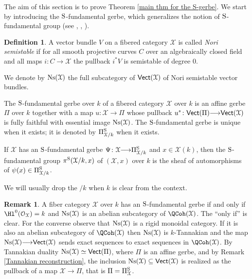 \documentclass[12pt,reqno]{amsart}
\theoremstyle{plain}
\theoremstyle{definition}
\newtheorem{defn}[thm]{Definition}
\newtheorem{rmk}[thm]{Remark}
\numberwithin{thm}{section}
\newcounter{x}\setcounter{x}{1}
\theoremstyle{plain}
\begin{document}
The aim of this section is to prove Theorem \ref{main thm for the S-gerbe}.
We start by introducing the ${\textup{S}}$-fundamental gerbe, which generalizes the notion of ${\textup{S}}$-fundamental group (see \cite{BPS}, \cite{L1}, \cite{L2}). 

\begin{defn}\label{Nori semistable}
A vector bundle $V$ on a fibered category ${\mathcal{X}}$ is called \emph{Nori semistable} if for all 
smooth projective curves $C$ over an algebraically closed field and all maps $i\colon C{\longrightarrow} 
{\mathcal{X}}$ the pullback $i^*V$ is semistable of degree $0$.
 
 We denote by ${\textup{Ns}}({\mathcal{X}})$ the full subcategory of ${\text{\sf Vect}}({\mathcal{X}})$ of Nori semistable vector bundles.
 
 The ${\textup{S}}$-fundamental gerbe over $k$ of a fibered category ${\mathcal{X}}$ over $k$ is an affine gerbe 
$\Pi$ over $k$ together with a map $u\colon {\mathcal{X}}{\longrightarrow} \Pi$ whose pullback $u^*\colon 
{\text{\sf Vect}}(\Pi){\longrightarrow} {\text{\sf Vect}}({\mathcal{X}})$ is fully faithful with essential image ${\textup{Ns}}({\mathcal{X}})$. The 
${\textup{S}}$-fundamental gerbe is unique when it exists; it is denoted by $\Pi^{\textup{S}}_{{\mathcal{X}}/k}$ when it exists.
 
If ${\mathcal{X}}$ has an ${\textup{S}}$-fundamental gerbe $\Psi\colon {\mathcal{X}}{\longrightarrow} \Pi^{\textup{S}}_{{\mathcal{X}}/k}$ and $x\in 
{\mathcal{X}}(k)$, then the ${\textup{S}}$-fundamental group $\pi^{\textup{S}}({\mathcal{X}}/k,x)$ of $({\mathcal{X}},x)$ over $k$ is the 
sheaf of automorphisms of $\psi(x)\in \Pi^{\textup{S}}_{{\mathcal{X}}/k}$.
 
We will usually drop the $/k$ when $k$ is clear from the context.
\end{defn}

\begin{rmk}\label{when X has an S-fundamental gerbe}
A fiber category ${\mathcal{X}}$ over $k$ has an ${\textup{S}}$-fundamental gerbe if and only if 
$\Hl^0({\mathcal{O}_{\mathcal{X}}})=k$ and ${\textup{Ns}}({\mathcal{X}})$ is an abelian subcategory of $\QCoh({\mathcal{X}})$. The ``only if'' is 
clear. For the converse observe that ${\textup{Ns}}({\mathcal{X}})$ is a rigid monoidal category. If it is also an 
abelian subcategory of $\QCoh({\mathcal{X}})$ then ${\textup{Ns}}({\mathcal{X}})$ is $k$-Tannakian and the map 
${\textup{Ns}}({\mathcal{X}}){\longrightarrow} {\text{\sf Vect}}({\mathcal{X}})$ sends exact sequences to exact sequences in $\QCoh({\mathcal{X}})$. By 
Tannakian duality ${\textup{Ns}}({\mathcal{X}}) \simeq {\text{\sf Vect}}(\Pi)$, where $\Pi$ is an affine gerbe, and by Remark 
\ref{Tannakian reconstruction}, the inclusion ${\textup{Ns}}({\mathcal{X}})\subseteq {\text{\sf Vect}}({\mathcal{X}})$ is realized as 
the pullback of a map ${\mathcal{X}}{\longrightarrow} \Pi$, that is $\Pi=\Pi^{\textup{S}}_{\mathcal{X}}$.
\end{rmk}
\end{document}
